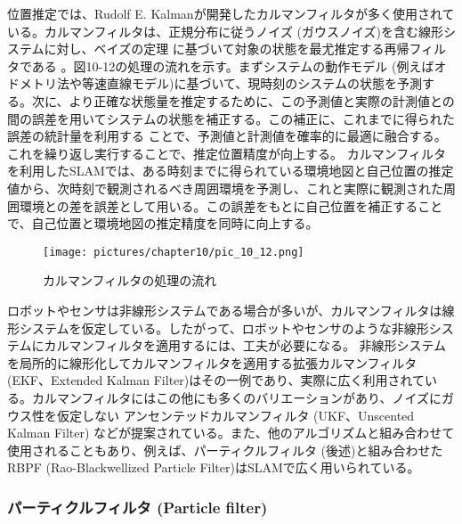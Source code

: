 位置推定では、Rudolf E. Kalmanが開発したカルマンフィルタが多く使用されている。カルマンフィルタは、正規分布に従うノイズ (ガウスノイズ)を含む線形システムに対し、ベイズの定理 に基づいて対象の状態を最尤推定する再帰フィルタである 。図10-12の処理の流れを示す。まずシステムの動作モデル  (例えばオドメトリ法や等速直線モデル)に基づいて、現時刻のシステムの状態を予測する。次に、より正確な状態量を推定するために、この予測値と実際の計測値との間の誤差を用いてシステムの状態を補正する。この補正に、これまでに得られた誤差の統計量を利用する ことで、予測値と計測値を確率的に最適に融合する。これを繰り返し実行することで、推定位置精度が向上する。
カルマンフィルタを利用したSLAMでは、ある時刻までに得られている環境地図と自己位置の推定値から、次時刻で観測されるべき周囲環境を予測し、これと実際に観測された周囲環境との差を誤差として用いる。この誤差をもとに自己位置を補正することで、自己位置と環境地図の推定精度を同時に向上する。

\begin{figure}[htp]
  \centering
  \texttt{[image: pictures/chapter10/pic\_10\_12.png]}
  \caption{カルマンフィルタの処理の流れ}
\end{figure}

ロボットやセンサは非線形システムである場合が多いが、カルマンフィルタは線形システムを仮定している。したがって、ロボットやセンサのような非線形システムにカルマンフィルタを適用するには、工夫が必要になる。 非線形システムを局所的に線形化してカルマンフィルタを適用する拡張カルマンフィルタ (EKF、Extended Kalman Filter)はその一例であり、実際に広く利用されている。カルマンフィルタにはこの他にも多くのバリエーションがあり、ノイズにガウス性を仮定しない アンセンテッドカルマンフィルタ (UKF、Unscented Kalman Filter)   などが提案されている。また、他のアルゴリズムと組み合わせて使用されることもあり、例えば、パーティクルフィルタ (後述)と組み合わせたRBPF (Rao-Blackwellized Particle Filter)はSLAMで広く用いられている。


\subsubsection{パーティクルフィルタ (Particle filter)}

